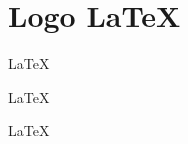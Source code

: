 \chapter{Logo LaTeX}

\vfill

\begin{center}
{\fontsize{50pt}{800pt}\selectfont \LaTeX}\
\end{center}

\vfill

\begin{center}
{\color{azulunb}\fontsize{50pt}{800pt}\selectfont \LaTeX}\
\end{center}

\vfill

\begin{center}
{\color{verdeunb}\fontsize{50pt}{800pt}\selectfont \LaTeX}\
\end{center}

\vfill